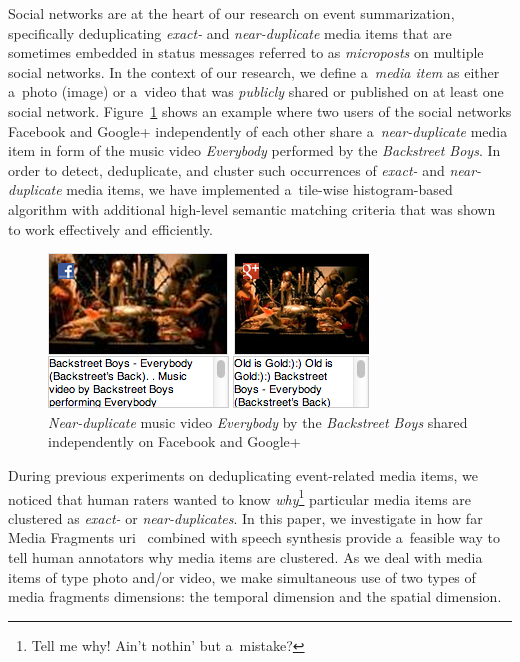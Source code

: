 \documentclass{article}
\begin{document}
Social networks are at the heart of our research on event summarization, specifically deduplicating \emph{exact-} and \emph{near-duplicate} media items that are sometimes embedded in status messages referred to as \emph{microposts} on multiple social networks. In the context of our research, we define a~\emph{media item} as either a~photo (image) or a~video that was \emph{publicly} shared or published on at least one social network. Figure~\ref{fig:near-duplicate} shows an example where two users of the social networks Facebook and Google+ independently of each other share a~\emph{near-duplicate} media item in form of the music video \emph{Everybody} performed by the \emph{Backstreet Boys}. In order to detect, deduplicate, and cluster such occurrences of \emph{exact-} and \emph{near-duplicate} media items, we have implemented a~tile-wise histogram-based algorithm with additional high-level semantic matching criteria that was shown to work effectively and efficiently.

\begin{figure}[b!]
  \centering
  \includegraphics[width=0.9\linewidth]{./backstreetboys.png}
  \caption{\emph{Near-duplicate} music video \emph{Everybody} by the \emph{Backstreet Boys} shared independently on Facebook and Google+}
  \label{fig:near-duplicate}
\end{figure}

During previous experiments on deduplicating event-related media items, we noticed that human raters wanted to know \emph{why}\footnote{Tell me why! Ain't nothin' but a~mistake?} particular media items are clustered as \emph{exact-} or \emph{near-duplicates}. In this paper, we investigate in how far
Media Fragments {\sc uri}~\cite{troncy2012mediafragments} combined with speech synthesis provide a~feasible way to tell human annotators why media items are clustered. As we deal with media items of type photo and/or video, we make simultaneous use of two types of media fragments dimensions: the temporal dimension and the spatial dimension.
\end{document}
